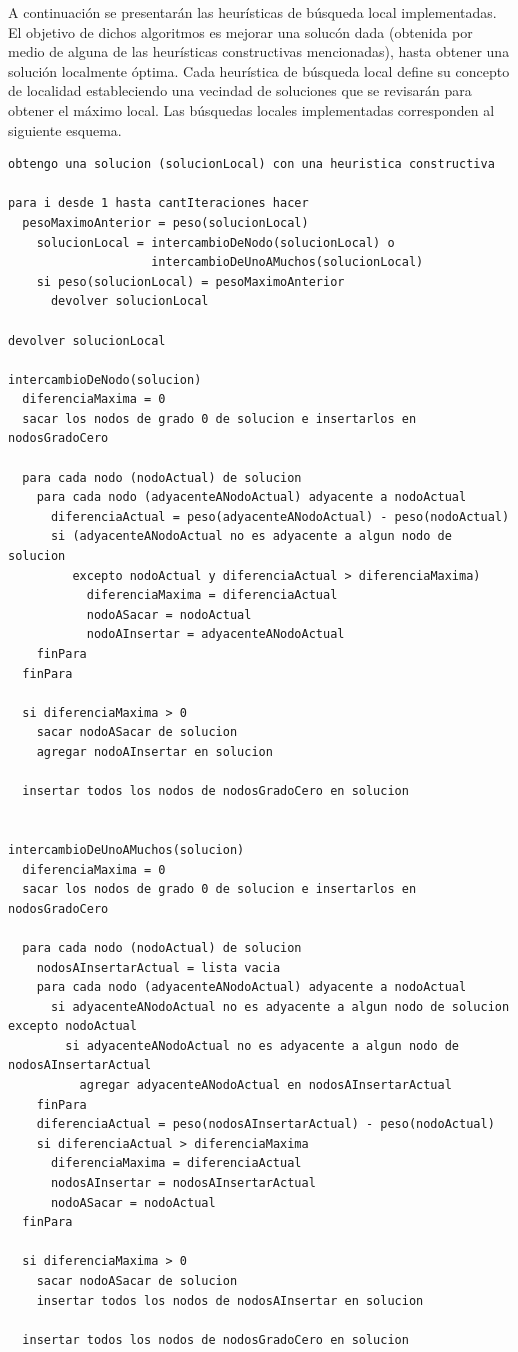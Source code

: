 \documentclass[a4paper,11pt] {article}
\begin{document}
A continuaci\'on se presentar\'an las heur\'isticas de b\'usqueda local implementadas. El objetivo de dichos algoritmos es mejorar una soluc\'on dada (obtenida por medio de alguna de las heur\'isticas constructivas mencionadas), hasta obtener una soluci\'on localmente \'optima. Cada heur\'istica de b\'usqueda local define su concepto de localidad estableciendo una vecindad de soluciones que se revisar\'an para obtener el m\'aximo local. Las b\'usquedas locales implementadas corresponden al siguiente esquema.

\begin{verbatim}
obtengo una solucion (solucionLocal) con una heuristica constructiva 

para i desde 1 hasta cantIteraciones hacer
  pesoMaximoAnterior = peso(solucionLocal)
    solucionLocal = intercambioDeNodo(solucionLocal) o 
                    intercambioDeUnoAMuchos(solucionLocal)
    si peso(solucionLocal) = pesoMaximoAnterior
      devolver solucionLocal

devolver solucionLocal

intercambioDeNodo(solucion)
  diferenciaMaxima = 0
  sacar los nodos de grado 0 de solucion e insertarlos en nodosGradoCero 

  para cada nodo (nodoActual) de solucion
    para cada nodo (adyacenteANodoActual) adyacente a nodoActual
      diferenciaActual = peso(adyacenteANodoActual) - peso(nodoActual)
      si (adyacenteANodoActual no es adyacente a algun nodo de solucion 
         excepto nodoActual y diferenciaActual > diferenciaMaxima)
           diferenciaMaxima = diferenciaActual
           nodoASacar = nodoActual
           nodoAInsertar = adyacenteANodoActual
    finPara
  finPara

  si diferenciaMaxima > 0
    sacar nodoASacar de solucion
    agregar nodoAInsertar en solucion

  insertar todos los nodos de nodosGradoCero en solucion


intercambioDeUnoAMuchos(solucion)
  diferenciaMaxima = 0
  sacar los nodos de grado 0 de solucion e insertarlos en nodosGradoCero

  para cada nodo (nodoActual) de solucion
    nodosAInsertarActual = lista vacia
    para cada nodo (adyacenteANodoActual) adyacente a nodoActual
      si adyacenteANodoActual no es adyacente a algun nodo de solucion excepto nodoActual
        si adyacenteANodoActual no es adyacente a algun nodo de nodosAInsertarActual
          agregar adyacenteANodoActual en nodosAInsertarActual
    finPara
    diferenciaActual = peso(nodosAInsertarActual) - peso(nodoActual)
    si diferenciaActual > diferenciaMaxima
      diferenciaMaxima = diferenciaActual
      nodosAInsertar = nodosAInsertarActual
      nodoASacar = nodoActual
  finPara

  si diferenciaMaxima > 0
    sacar nodoASacar de solucion
    insertar todos los nodos de nodosAInsertar en solucion

  insertar todos los nodos de nodosGradoCero en solucion
\end{verbatim}
\end{document}
